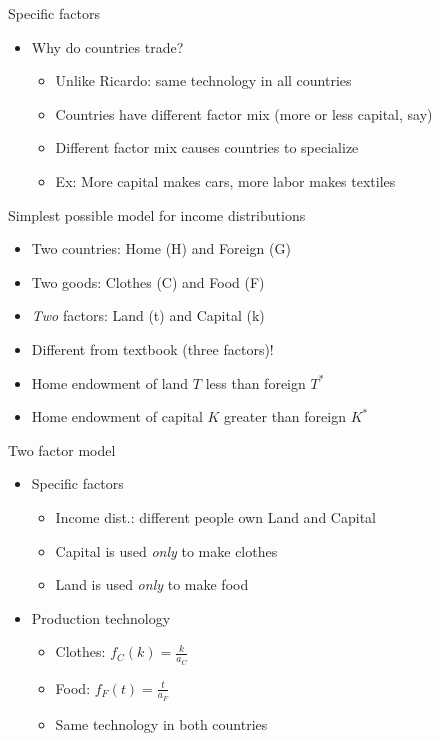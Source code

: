 \documentclass[ignorenonframetext,]{beamer}
\begin{document}
\begin{frame}{Specific factors}

    \begin{itemize}
        \item Why do countries trade? 
        \begin{itemize}
            \item Unlike Ricardo: same technology in all countries 
            \item Countries have different factor mix (more or less capital, say)
            \item Different factor mix causes countries to specialize
            \item Ex: More capital makes cars, more labor makes textiles
        \end{itemize}
    \end{itemize}

\end{frame}

\begin{frame}{Simplest possible model for income distributions}

    \begin{itemize}
        \item Two countries: Home (H) and Foreign (G)
        \item Two goods: Clothes (C) and Food (F)
        \item \emph{Two} factors: Land (t) and Capital (k)
        \item Different from textbook (three factors)!
        \item Home endowment of land $T$ less than foreign $T^*$
        \item Home endowment of capital $K$ greater than foreign $K^*$
    \end{itemize}

\end{frame}

\begin{frame}{Two factor model}

    \begin{itemize}
        \item Specific factors
        \begin{itemize}
            \item Income dist.: different people own Land and Capital 
            \item Capital is used \emph{only} to make clothes
            \item Land is used \emph{only} to make food
        \end{itemize}
        \item Production technology
        \begin{itemize}
            \item Clothes: $f_C(k) = \frac{k}{a_C}$
            \item Food: $f_F(t) = \frac{t}{a_F}$
            \item Same technology in both countries
        \end{itemize}
    \end{itemize}

\end{frame}
\end{document}
